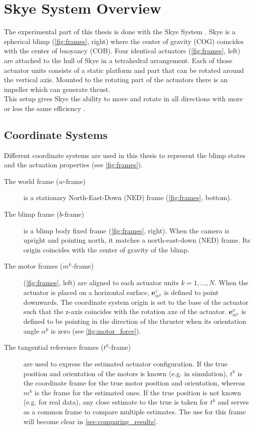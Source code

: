 \section{Skye System Overview}
The experimental part of this thesis is done with the Skye System \citep{Skye2013}.
Skye is a spherical blimp (\cref{fig:frames}, right) where the center of gravity (COG) coincides with the center of buoyancy (COB).
Four identical actuators (\cref{fig:frames}, left) are attached to the hull of Skye in a tetrahedral arrangement.
Each of those actuator units consists of a static platform and part that can be rotated around the vertical axis.
Mounted to the rotating part of the actuators there is an impeller which can generate thrust.
\\

This setup gives Skye the ability to move and rotate in all directions with more or less the same efficiency \citep[see][chap. 3]{Schaffner2012}.

\subsection{Coordinate Systems}
\label{sub:coordinate_systems}
Different coordinate systems are used in this thesis to represent the blimp states and the actuation properties (see \cref{fig:frames}).
\begin{description}
\item[The world frame ($w$-frame)] is a stationary North-East-Down (NED) frame (\cref{fig:frames}, bottom).
\item[The blimp frame ($b$-frame)] is a blimp body fixed frame (\cref{fig:frames}, right).
When the camera is upright and pointing north, it matches a north-east-down (NED) frame.
Its origin coincides with the center of gravity of the blimp.
\item[The motor frames ($m^k$-frame)] (\cref{fig:frames}, left) are aligned to each actuator units $k=1,...,N$.
When the actuator is placed on a horizontal surface, $\mathbf{e}_{m^k}^z$ is defined to point downwards.
The coordinate system origin is set to the base of the actuator such that the z-axis coincides with the rotation axe of the actuator.
$\mathbf{e}_{m^k}^x$ is defined to be pointing in the direction of the thruster when its orientation angle $\alpha^k$ is zero (see \cref{fig:motor_force}).
\item[The tangential reference frames ($t^k$-frame)] are used to express the estimated actuator configuration.
If the true position and orientation of the motors is known (e.g. in simulation), $t^k$ is the coordinate frame for the true motor position and orientation, whereas $m^k$ is the frame for the estimated ones.
If the true position is not known (e.g. for real data), any close estimate to the true is taken for $t^k$ and serves as a common frame to compare multiple estimates.
The use for this frame will become clear in \cref{sec:comparing_results}.
\end{description}


